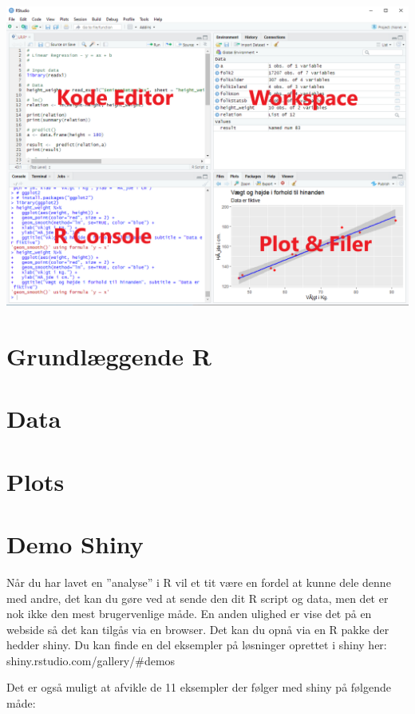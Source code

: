 \documentclass[
]{book}
\begin{document}
\includegraphics{img/rstudio_editor.png}

\hypertarget{grund}{%
\chapter{Grundlæggende R}\label{grund}}

\hypertarget{data}{%
\chapter{Data}\label{data}}

\hypertarget{plots}{%
\chapter{Plots}\label{plots}}

\hypertarget{shiny}{%
\chapter{Demo Shiny}\label{shiny}}

Når du har lavet en ''analyse'' i R vil et tit være en fordel at kunne dele denne med andre, det kan du gøre ved at sende den dit R script og data, men det er nok ikke den mest brugervenlige måde.
En anden ulighed er vise det på en webside så det kan tilgås via en browser. Det kan du opnå via en R pakke der hedder shiny.
Du kan finde en del eksempler på løsninger oprettet i shiny her: shiny.rstudio.com/gallery/\#demos

Det er også muligt at afvikle de 11 eksempler der følger med shiny på følgende måde:
\end{document}
